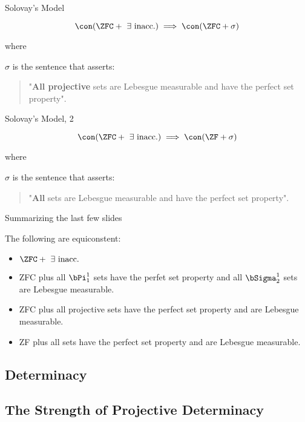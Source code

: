 \documentclass{beamer}
\begin{document}
\begin{frame}{Solovay's Model}
\begin{theorem}[Solovay, 1970]

$$\con(\ZFC + \text{ } \exists \text{ inacc.}) \implies \con(\ZFC + \sigma)$$

where

$\sigma$ is the sentence that asserts:

\begin{quotation}
"\textbf{All projective} sets are Lebesgue
measurable and have the perfect set property".
\end{quotation}

\end{theorem}
\end{frame}

\begin{frame}{Solovay's Model, 2}
\begin{theorem}[Solovay, 1970]

$$\con(\ZFC + \text{ } \exists \text{ inacc.}) \implies \con(\ZF + \sigma)$$

where

$\sigma$ is the sentence that asserts:

\begin{quotation}
"\textbf{All} sets are Lebesgue
measurable and have the perfect set property".
\end{quotation}
\end{theorem}
\end{frame}

\begin{frame}{Summarizing the last few slides}

The following are equiconstent:

\begin{itemize}
  \item $\ZFC + \text{ } \exists \text{ inacc.}$
  \item ZFC plus all $\bPi^1_1$ sets have the perfet set property and all $\bSigma^1_2$ sets are Lebesgue measurable.
  \item ZFC plus all projective sets have the perfect set property and are Lebesgue measurable.
  \item ZF plus all sets have the perfect set property and are Lebesgue measurable.
\end{itemize}

\end{frame}


\subsection{Determinacy}

\subsection{The Strength of Projective Determinacy}
\end{document}
